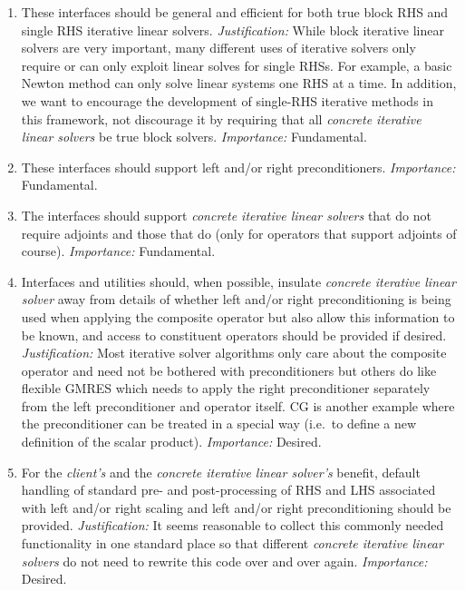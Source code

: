 \documentclass[pdf,ps2pdf,11pt]{SANDreport}
\begin{document}
\begin{enumerate}
\item

These interfaces should be general and efficient for both true block
RHS and single RHS iterative linear solvers.
{}\textit{Justification:} While block iterative linear solvers are
very important, many different uses of iterative solvers only require
or can only exploit linear solves for single RHSs.  For example, a
basic Newton method can only solve linear systems one RHS at a time.
In addition, we want to encourage the development of single-RHS
iterative methods in this framework, not discourage it by requiring
that all {}\textit{concrete iterative linear solvers} be true block
solvers.  {}\textit{Importance:} Fundamental.

\item

These interfaces should support left and/or right preconditioners.
{}\textit{Importance:} Fundamental.

\item

The interfaces should support {}\textit{concrete iterative linear
solvers} that do not require adjoints and those that do (only for
operators that support adjoints of course).  {}\textit{Importance:}
Fundamental.

\item

Interfaces and utilities should, when possible, insulate
{}\textit{concrete iterative linear solver} away from details of
whether left and/or right preconditioning is being used when applying
the composite operator but also allow this information to be known,
and access to constituent operators should be provided if desired.
{}\textit{Justification:} Most iterative solver algorithms only care
about the composite operator and need not be bothered with
preconditioners but others do like flexible GMRES which needs to apply
the right preconditioner separately from the left preconditioner and
operator itself.  CG is another example where the preconditioner can
be treated in a special way (i.e.~to define a new definition of the
scalar product). {}\textit{Importance:} Desired.

\item

For the {}\textit{client's} and the {}\textit{concrete iterative
linear solver's} benefit, default handling of standard pre- and
post-processing of RHS and LHS associated with left and/or right
scaling and left and/or right preconditioning should be provided.
{}\textit{Justification:} It seems reasonable to collect this commonly
needed functionality in one standard place so that different
{}\textit{concrete iterative linear solvers} do not need to rewrite
this code over and over again.  {}\textit{Importance:} Desired.


\end{enumerate}
\end{document}
